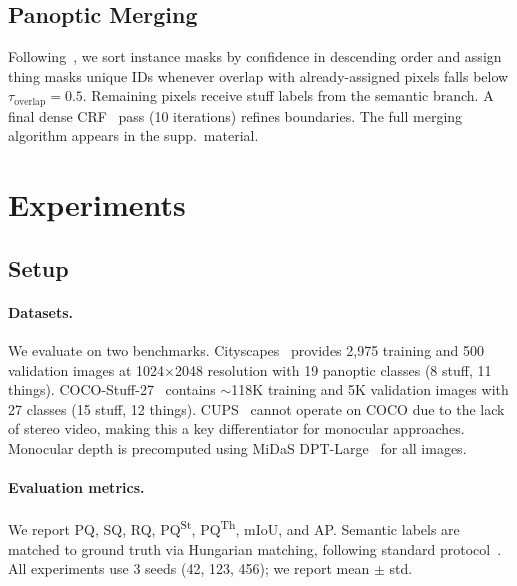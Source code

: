 \documentclass[10pt,twocolumn,letterpaper]{article}
\begin{document}
\subsection{Panoptic Merging}
\label{sec:merge}

Following~\cite{kirillov2019panoptic}, we sort instance masks by confidence in descending order and assign thing masks unique IDs whenever overlap with already-assigned pixels falls below $\tau_{\text{overlap}}{=}0.5$. Remaining pixels receive stuff labels from the semantic branch. A final dense CRF~\cite{krahenbuhl2011crf} pass (10 iterations) refines boundaries. The full merging algorithm appears in the supp.\ material.


\section{Experiments}
\label{sec:experiments}

\subsection{Setup}

\paragraph{Datasets.}
We evaluate on two benchmarks. Cityscapes~\cite{cordts2016cityscapes} provides 2,975 training and 500 validation images at 1024$\times$2048 resolution with 19 panoptic classes (8 stuff, 11 things). COCO-Stuff-27~\cite{caesar2018cocostuff} contains ${\sim}$118K training and 5K validation images with 27 classes (15 stuff, 12 things). CUPS~\cite{hahn2025cups} cannot operate on COCO due to the lack of stereo video, making this a key differentiator for monocular approaches. Monocular depth is precomputed using MiDaS DPT-Large~\cite{ranftl2020midas} for all images.

\paragraph{Evaluation metrics.}
We report PQ, SQ, RQ, PQ\textsuperscript{St}, PQ\textsuperscript{Th}, mIoU, and AP. Semantic labels are matched to ground truth via Hungarian matching, following standard protocol~\cite{hamilton2022stego}. All experiments use 3 seeds (42, 123, 456); we report mean $\pm$ std.
\end{document}
